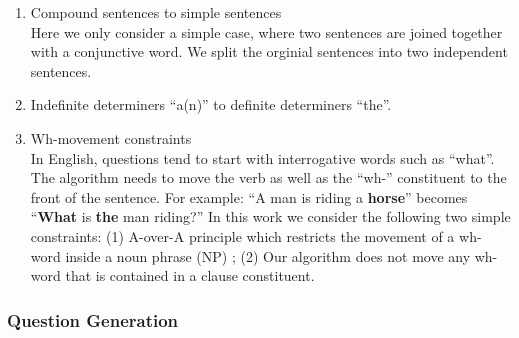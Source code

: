 \documentclass{article} %
\renewcommand{\#}[1]{\textbf{#1}}
\begin{document}
\begin{enumerate}[leftmargin=*]

\item Compound sentences to simple sentences \\ Here we only consider a simple
case, where two sentences are joined together with a conjunctive word. We split
the orginial sentences into two independent sentences.

\item Indefinite determiners ``a(n)'' to definite determiners ``the''.

\item Wh-movement constraints \\ In English, questions tend to start with
interrogative words such as ``what''. The algorithm needs to move the verb as
well as the ``wh-'' constituent to the front of the sentence. For example: ``A
man is riding a \textbf{horse}'' becomes   ``\textbf{What} is \textbf{the} man
riding?'' In this work we consider the following two simple constraints: (1)
A-over-A principle which restricts the movement of a wh-word inside a noun
phrase (NP) \cite{chomsky73}; (2) Our algorithm does not move any wh-word that
is contained in a clause constituent.

\end{enumerate}

\subsubsection{Question Generation}
\end{document}
